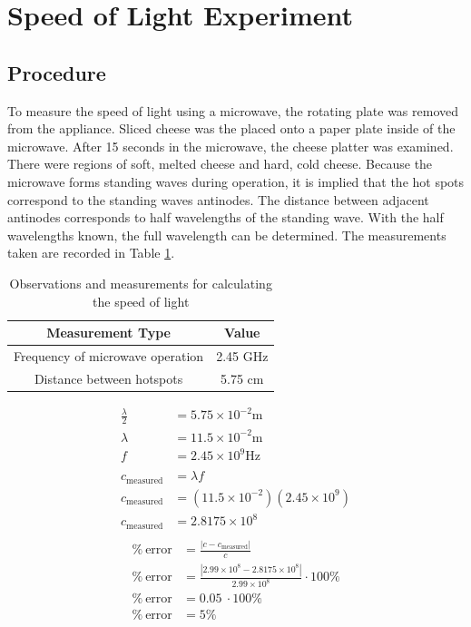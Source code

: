\documentclass[journal]{IEEEtran}
\begin{document}
\section{Speed of Light Experiment}

\subsection{Procedure}

To measure the speed of light using a microwave, the rotating plate was removed
from the appliance. Sliced cheese was the placed onto a paper plate inside of
the microwave. After 15 seconds in the microwave, the cheese platter was
examined. There were regions of soft, melted cheese and hard, cold cheese.
Because the microwave forms standing waves during operation, it is implied that
the hot spots correspond to the standing waves antinodes. The distance between
adjacent antinodes corresponds to half wavelengths of the standing wave. With the half wavelengths known,
the full wavelength can be determined. The measurements taken are recorded in Table \ref{table:speed}.

\begin{table}[htbp]
    \centering
        \caption{Observations and measurements for calculating the speed of light  \label{table:speed}}
        \begin{tabular}{|c|c|}
            \hline
            \textbf{Measurement Type}         & \textbf{Value} \\ \hline
            Frequency of microwave operation & 2.45 GHz       \\ \hline
            Distance between hotspots         & 5.75 cm        \\ \hline
        \end{tabular}
\end{table}

\begin{align*}
\frac{\lambda }{2} & =5.75\times 10^{-2}\text{m}\\
\lambda  & =11.5\times 10^{-2}\text{m}\\
f & =2.45\times 10^{9}\text{Hz}\\
 & \\
c_{\text{measured}} & =\lambda f\\
c_{\text{measured}} & =\left( 11.5\times 10^{-2}\right)\left( 2.45\times 10^{9}\right)\\
c_{\text{measured}} & =2.8175\times 10^{8} \\
\end{align*}
\begin{align*}
\%\ \text{error} & =\frac{|c-c_{\text{measured}}{} |}{c}\\
\%\ \text{error} & =\frac{|2.99\times 10^{8} -2.8175\times 10^{8} |}{2.99\times 10^{8}} \cdot 100\%\\
\%\ \text{error} & =0.05\ \cdot 100\%\\
\%\ \text{error} & =5\%
\end{align*}
\end{document}
